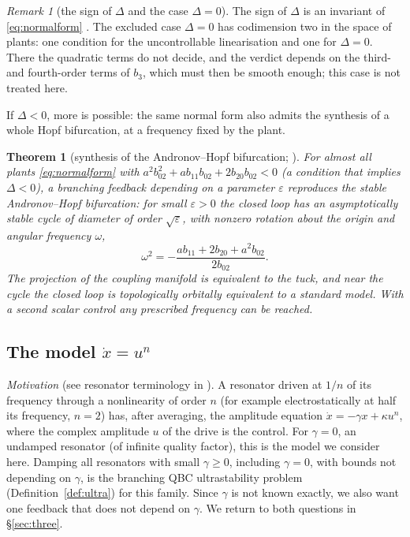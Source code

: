 \documentclass[11pt,reqno]{amsart}
\theoremstyle{plain}
\newtheorem*{theorem}{Theorem}
\theoremstyle{definition}
\theoremstyle{remark}
\newtheorem*{remark}{Remark}
\begin{document}
\begin{remark}[the sign of $\Delta$ and the case $\Delta=0$]
The sign of $\Delta$ is an invariant of \eqref{eq:normalform} \cite[\S4.2]{Shosh1990}. The excluded
case $\Delta=0$ has codimension two in the space of plants: one condition for the uncontrollable linearisation and
one for $\Delta=0$. There the quadratic terms do not decide, and the verdict depends on the third- and fourth-order
terms of $b_3$, which must then be smooth enough; this case is not treated here.
\end{remark}

If $\Delta<0$, more is possible: the same normal form also admits the synthesis of a whole Hopf bifurcation, at a
frequency fixed by the plant.

\begin{theorem}[synthesis of the Andronov--Hopf bifurcation; {\cite[Thms.~4.5, 4.6, Rem.~4.7]{Shosh1990}}]
\label{thm:hopf-synth}
For almost all plants \eqref{eq:normalform} with $a^{2}b_{02}^{2}+ab_{11}b_{02}+2b_{20}b_{02}<0$ (a condition that
implies $\Delta<0$), a branching feedback depending on a parameter $\varepsilon$ reproduces the stable Andronov--Hopf bifurcation: for small
$\varepsilon>0$ the closed loop has an asymptotically stable cycle of diameter of order $\sqrt\varepsilon$, with nonzero
rotation about the origin and angular frequency $\omega$,
\[
  \omega^{2}=-\frac{ab_{11}+2b_{20}+a^{2}b_{02}}{2b_{02}} .
\]
The projection of the coupling manifold is equivalent to the tuck, and near the cycle the closed loop is
topologically orbitally equivalent to a standard model. With a second scalar control any prescribed frequency
can be reached.
\end{theorem}

\subsection{The model $\dot x=u^{n}$}\label{sec:model-u2}
\emph{Motivation} (see resonator terminology in \cite{NayfehMook1979}). A resonator driven at $1/n$ of its frequency through a nonlinearity of order $n$ (for example electrostatically at half its frequency, $n=2$) has, after averaging, the amplitude equation $\dot x=-\gamma x+\kappa u^{n}$, where the complex amplitude $u$ of the drive is the control. For $\gamma=0$, an undamped resonator (of infinite quality factor), this is the model we consider here. Damping all resonators with small $\gamma\ge0$, including $\gamma=0$, with bounds not depending on $\gamma$, is the branching QBC ultrastability problem (Definition~\ref{def:ultra}) for this family. Since $\gamma$ is not known exactly, we also want one feedback that does not depend on $\gamma$. We return to both questions in \S\ref{sec:three}.
\end{document}
